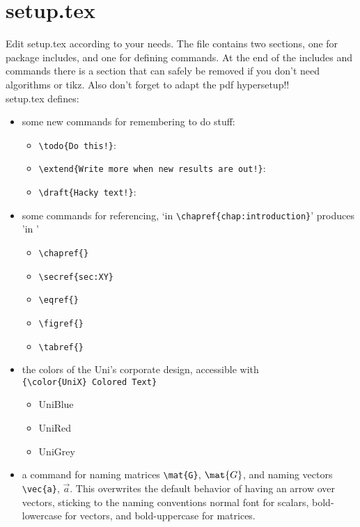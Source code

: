 \section{setup.tex}\label{sec:setup}
Edit setup.tex according to your needs. The file contains two sections, one for package includes, and one for defining commands. At the end of the includes and commands there is a section that can safely be removed if you don't need algorithms or tikz. Also don't forget to adapt the pdf hypersetup!!\\
setup.tex defines:
\begin{itemize}
    \item some new commands for remembering to do stuff:
    \begin{itemize}
        \item \verb|\todo{Do this!}|: 
        \item \verb|\extend{Write more when new results are out!}|:\\ 
        \item \verb|\draft{Hacky text!}|: 
    \end{itemize}

    \item some commands for referencing, `in \verb|\chapref{chap:introduction}|' produces 'in '
    \begin{itemize}
        \item \verb|\chapref{}|
        \item \verb|\secref{sec:XY}|
        \item \verb|\eqref{}|
        \item \verb|\figref{}|
        \item \verb|\tabref{}|
    \end{itemize}

    \item the colors of the Uni's corporate design, accessible with\\ \verb|{\color{UniX} Colored Text}|
    \begin{itemize}
        \item {\color{UniBlue}UniBlue}
        \item {\color{UniRed}UniRed}
        \item {\color{UniGrey}UniGrey}
    \end{itemize}

    \item a command for naming matrices \verb|\mat{G}|, $\mat{G}$, and naming vectors \verb|\vec{a}|, $\vec{a}$. This overwrites the default behavior of having an arrow over vectors, sticking to the naming conventions  normal font for scalars, bold-lowercase for vectors, and bold-uppercase for matrices.


\end{itemize}
